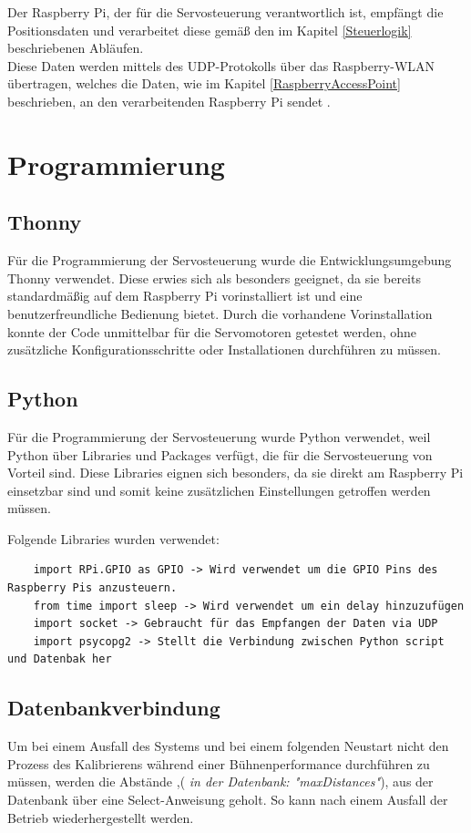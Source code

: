 Der Raspberry Pi, der für die Servosteuerung verantwortlich ist, empfängt die Positionsdaten und verarbeitet diese gemäß den im Kapitel \ref{Steuerlogik} beschriebenen Abläufen. \\
Diese Daten werden mittels des UDP-Protokolls über das Raspberry-WLAN übertragen, welches die Daten, wie im Kapitel \ref{RaspberryAccessPoint} beschrieben, an den verarbeitenden Raspberry Pi sendet	.

\newpage
\section{Programmierung}
\subsection{Thonny}
Für die Programmierung der Servosteuerung wurde die Entwicklungsumgebung Thonny verwendet. Diese erwies sich als besonders geeignet, da sie bereits standardmäßig auf dem Raspberry Pi vorinstalliert ist und eine benutzerfreundliche Bedienung bietet. Durch die vorhandene Vorinstallation konnte der Code unmittelbar für die Servomotoren getestet werden, ohne zusätzliche Konfigurationsschritte oder Installationen durchführen zu müssen.

\subsection{Python}
Für die Programmierung der Servosteuerung wurde Python verwendet, weil Python über Libraries und Packages verfügt, die für die Servosteuerung von Vorteil sind. Diese Libraries eignen sich besonders, da sie direkt am Raspberry Pi einsetzbar sind und somit keine zusätzlichen Einstellungen getroffen werden müssen.

Folgende Libraries wurden verwendet:

\begin{lstlisting}
	import RPi.GPIO as GPIO -> Wird verwendet um die GPIO Pins des Raspberry Pis anzusteuern.
	from time import sleep -> Wird verwendet um ein delay hinzuzufügen
	import socket -> Gebraucht für das Empfangen der Daten via UDP
	import psycopg2 -> Stellt die Verbindung zwischen Python script und Datenbak her
\end{lstlisting}

\subsection{Datenbankverbindung}
Um bei einem Ausfall des Systems und bei einem folgenden Neustart nicht den Prozess des Kalibrierens während einer Bühnenperformance durchführen zu müssen, werden die Abstände ,(\textit{ in der Datenbank: "maxDistances"}), aus der Datenbank über eine Select-Anweisung geholt. So kann nach einem Ausfall der Betrieb wiederhergestellt werden.

